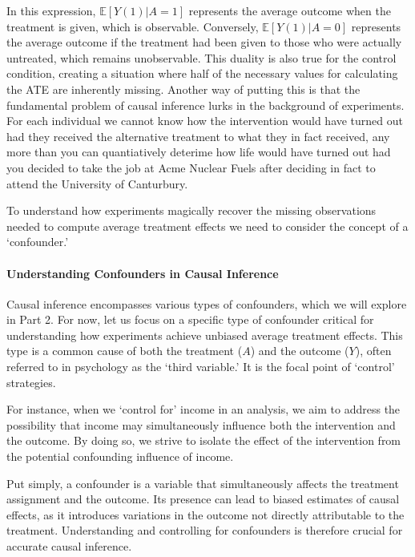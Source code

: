\documentclass[
  singlecolumn]{article}
\let\oldparagraph\paragraph
\renewcommand{\paragraph}[1]{\oldparagraph{#1}\mbox{}}
\begin{document}
In this expression, \(\mathbb{E}[Y(1)|A = 1]\) represents the average
outcome when the treatment is given, which is observable. Conversely,
\(\mathbb{E}[Y(1)|A = 0]\) represents the average outcome if the
treatment had been given to those who were actually untreated, which
remains unobservable. This duality is also true for the control
condition, creating a situation where half of the necessary values for
calculating the ATE are inherently missing. Another way of putting this
is that the fundamental problem of causal inference lurks in the
background of experiments. For each individual we cannot know how the
intervention would have turned out had they received the alternative
treatment to what they in fact received, any more than you can
quantiatively deterime how life would have turned out had you decided to
take the job at Acme Nuclear Fuels after deciding in fact to attend the
University of Canturbury.

To understand how experiments magically recover the missing observations
needed to compute average treatment effects we need to consider the
concept of a `confounder.'

\paragraph{Understanding Confounders in Causal
Inference}\label{understanding-confounders-in-causal-inference}

Causal inference encompasses various types of confounders, which we will
explore in Part 2. For now, let us focus on a specific type of
confounder critical for understanding how experiments achieve unbiased
average treatment effects. This type is a common cause of both the
treatment (\(A\)) and the outcome (\(Y\)), often referred to in
psychology as the `third variable.' It is the focal point of `control'
strategies.

For instance, when we `control for' income in an analysis, we aim to
address the possibility that income may simultaneously influence both
the intervention and the outcome. By doing so, we strive to isolate the
effect of the intervention from the potential confounding influence of
income.

Put simply, a confounder is a variable that simultaneously affects the
treatment assignment and the outcome. Its presence can lead to biased
estimates of causal effects, as it introduces variations in the outcome
not directly attributable to the treatment. Understanding and
controlling for confounders is therefore crucial for accurate causal
inference.
\end{document}
